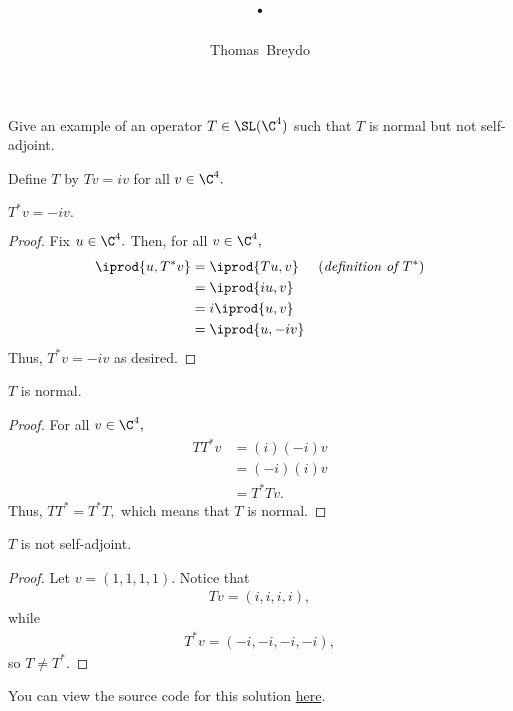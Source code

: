 \documentclass{amsart}
\title{\pagenum.\probnum}
\author{Thomas\ Breydo}
\newcommand{\pagenum}{215}
\newcommand{\probnum}{13}
\begin{document}
\maketitle

\begin{problem*}
Give an example of an operator $T\in\SL(\C^4)$ such that $T$ is
normal but not self-adjoint.
\end{problem*}

\vspace{0.5in}

Define $T$ by $Tv=iv$ for all $v\in\C^4.$
\begin{claim*}
$T^*v=-iv.$
\end{claim*}
\begin{proof}
Fix $u\in\C^4.$ Then, for all $v\in\C^4,$
\begin{align*}
    \iprod{u, T^*v}
    &= \iprod{Tu, v} &&(\textit{definition of $T^*$})\\
    &= \iprod{iu, v} \\
    &= i\iprod{u, v} \\ 
    &= \iprod{u, -iv}
\end{align*}
Thus, $T^*v=-iv$ as desired.
\end{proof}

\begin{claim*}
$T$ is normal.
\end{claim*}
\begin{proof}
For all $v\in\C^4,$
\begin{align*}
    TT^*v &= (i)(-i)v \\
          &= (-i)(i)v \\
          &= T^*Tv.
\end{align*}
Thus, $TT^*=T^*T,$ which means that $T$ is normal.
\end{proof}

\begin{claim*}
$T$ is not self-adjoint.
\end{claim*}
\begin{proof}
    Let $v=(1,1,1,1).$ Notice that
\begin{align*}
    Tv=(i,i,i,i),
\end{align*}
while
\begin{align*}
    T^*v=(-i,-i,-i,-i),
\end{align*}
so $T\ne T^*.$
\end{proof}

\vspace{0.5in}

\begin{note*}
You can view the source code for this solution
\href{https://github.com/thomasbreydo/linalg/blob/main/\pagenum_\probnum_Thomas_Breydo.tex}
{here}.
\end{note*}
\end{document}

